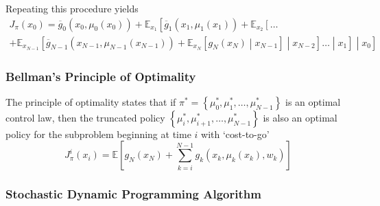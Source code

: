 \documentclass[11pt]{report} %
\begin{document}
Repeating this procedure yields
\begin{multline}
J_{\pi}\left(x_{0}\right) = \overline{g}_{0}\left(x_{0},\mu_{0}\left(x_{0}\right)\right)+\mathbb{E}_{x_{1}}\left[\overline{g}_{1}\left(x_{1},\mu_{1}\left(x_{1}\right)\right)+\mathbb{E}_{x_{2}}\left[\dots \right.\right. \\
\left.\left. +\mathbb{E}_{x_{N-1}}\left[\overline{g}_{N-1}\left(x_{N-1},\mu_{N-1}\left(x_{N-1}\right)\right)+\mathbb{E}_{x_{N}}\left[g_{N}\left(x_{N}\right)\middle|x_{N-1}\right]\middle|x_{N-2}\right]\dots\middle|x_{1}\right]\middle|x_{0}\right]
\end{multline}

\subsubsection{Bellman's Principle of Optimality}

The principle of optimality states that if $\pi^{*} = \left\{\mu_{0}^{*}, \mu_{1}^{*}, \dots, \mu_{N - 1}^{*}\right\}$ is an optimal control law, then the truncated policy $\left\{\mu_{i}^{*}, \mu_{i + 1}^{*}, \dots, \mu_{N - 1}^{*}\right\}$ is also an optimal policy for the subproblem beginning at time $i$ with `cost-to-go'
\begin{equation}
J_{\pi}^{i}\left(x_{i}\right) = \mathbb{E}\left[g_{N}\left(x_{N}\right)+\sum_{k=i}^{N-1}g_{k}\left(x_{k},\mu_{k}\left(x_{k}\right),w_{k}\right)\right]
\end{equation}

\subsubsection{Stochastic Dynamic Programming Algorithm}
\end{document}
